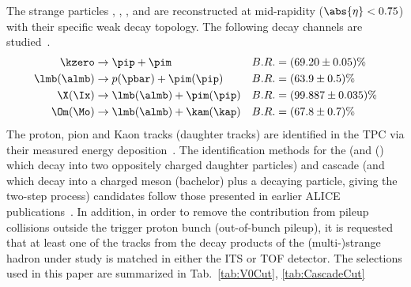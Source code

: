 The strange particles \kzero, \lmb, \almb, \Xis and \Oms are reconstructed at mid-rapidity ($\abs{\eta} < 0.75$) with their specific weak decay topology.
The following decay channels are studied~\cite{PhysRevD.98.030001}.
$$
\begin{aligned}
\kzero       & \to \pip + \pim                & B.R. & = (69.20  \pm 0.05)  \%  \\
\lmb (\almb) & \to p(\pbar) + \pim (\pip)     & B.R. & = (63.9   \pm 0.5)   \% \\
\X (\Ix)     & \to \lmb (\almb) + \pim (\pip) & B.R. & = (99.887 \pm 0.035) \% \\
\Om (\Mo)    & \to \lmb (\almb) + \kam (\kap) & B.R. & = (67.8   \pm 0.7)   \% \\
\end{aligned}
$$
The proton, pion and Kaon tracks (daughter tracks) are identified in the TPC via their measured energy deposition~\cite{Abelev:2014ffa}.
The identification methods for the \Vzero (\kzero and \lmb (\almb) which decay into two oppositely charged daughter particles) and cascade (\Xis and \Oms which decay into a charged meson (bachelor) plus a \Vzero decaying particle, giving the two-step process) candidates follow those presented in earlier ALICE publications~\cite{Aamodt:2011zza, Abelev:2012jp, Acharya:2018orn, Abelev:2013haa, Acharya:2020uxl, Acharya:2019kyh}.
In addition, in order to remove the contribution from pileup collisions outside the trigger proton bunch (out-of-bunch pileup), it is requested that at least one of the tracks from the decay products of the (multi-)strange hadron under study is matched in either the ITS or TOF detector.
The selections used in this paper are summarized in Tab.~\ref{tab:V0Cut}, \ref{tab:CascadeCut}
